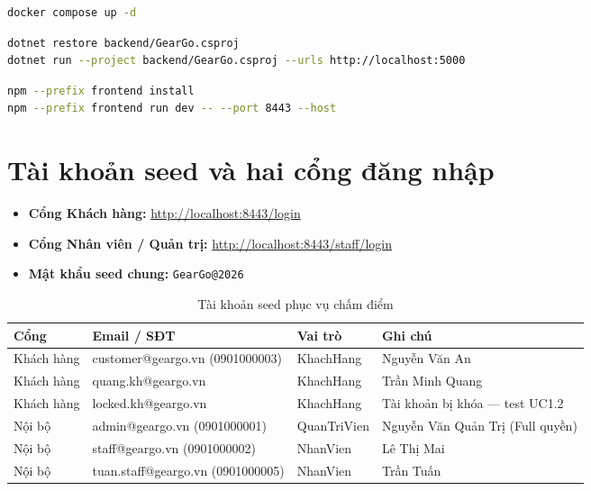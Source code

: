 \begin{lstlisting}[language=bash, caption={Bước 1 --- Khởi tạo SQL Server}]
docker compose up -d
\end{lstlisting}

\begin{lstlisting}[language=bash, caption={Bước 2 --- Chạy Backend (tự migrate + seed)}]
dotnet restore backend/GearGo.csproj
dotnet run --project backend/GearGo.csproj --urls http://localhost:5000
\end{lstlisting}

\begin{lstlisting}[language=bash, caption={Bước 3 --- Chạy Frontend}]
npm --prefix frontend install
npm --prefix frontend run dev -- --port 8443 --host
\end{lstlisting}

\section{Tài khoản seed và hai cổng đăng nhập}
\label{sec:tai_khoan_seed}

\begin{itemize}
  \item \textbf{Cổng Khách hàng:} \url{http://localhost:8443/login}
  \item \textbf{Cổng Nhân viên / Quản trị:} \url{http://localhost:8443/staff/login}
  \item \textbf{Mật khẩu seed chung:} \texttt{GearGo@2026}
\end{itemize}

\begin{table}[H]
\centering
\caption{Tài khoản seed phục vụ chấm điểm}
\label{tab:tai_khoan_seed}
\begin{tabularx}{\textwidth}{|l|l|l|X|}
\hline
\textbf{Cổng} & \textbf{Email / SĐT} & \textbf{Vai trò} & \textbf{Ghi chú} \\ \hline
Khách hàng  & customer@geargo.vn (0901000003) & KhachHang    & Nguyễn Văn An \\ \hline
Khách hàng  & quang.kh@geargo.vn               & KhachHang    & Trần Minh Quang \\ \hline
Khách hàng  & locked.kh@geargo.vn              & KhachHang    & Tài khoản bị khóa --- test UC1.2 \\ \hline
Nội bộ      & admin@geargo.vn (0901000001)    & QuanTriVien  & Nguyễn Văn Quản Trị (Full quyền) \\ \hline
Nội bộ      & staff@geargo.vn (0901000002)    & NhanVien     & Lê Thị Mai \\ \hline
Nội bộ      & tuan.staff@geargo.vn (0901000005) & NhanVien   & Trần Tuấn \\ \hline
\end{tabularx}
\end{table}

